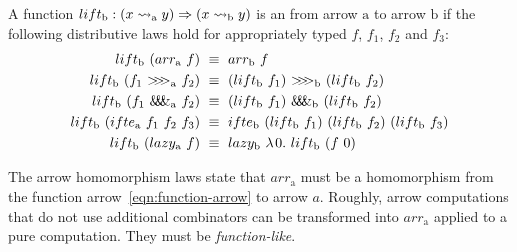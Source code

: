 \documentclass[preprint]{sigplanconf}
\newcommand{\arrow}{\rightsquigarrow}
\newcommand{\arrowlift}{\ensuremath{lift}}
\newcommand{\arrowarr}{\ensuremath{arr}}
\newcommand{\arrowcomp}{\ensuremath{{>}\mspace{-6mu}{>}\mspace{-6mu}{>}}}
\newcommand{\arrowpair}{\ensuremath{\mathit{\&\mspace{-7.5mu}\&\mspace{-7.5mu}\&}}}
\newcommand{\arrowif}{\ensuremath{ifte}}
\newcommand{\arrowlazy}{\ensuremath{lazy}}
\newcommand{\gen}{_\mathrm{a}}
\newcommand{\genb}{_\mathrm{b}}
\begin{document}
\begin{definition}
A function $lift\genb : (x \arrow\gen y) \tto (x \arrow\genb y)$ is an  from arrow $\mathrm{a}$ to arrow $\mathrm{b}$ if the following distributive laws hold for appropriately typed $f$, $f_1$, $f_2$ and $f_3$:
\begin{align}
	lift\genb~(\arrowarr\gen~f) &\ \equiv \ \arrowarr\genb~f
	\label{eqn:lift-distributes-over-arr}
\\
	lift\genb~(f_1~\arrowcomp\gen~f_2) &\ \equiv \ (lift\genb~f_1)~\arrowcomp\genb~(lift\genb~f_2)
	\label{eqn:lift-distributes-over-comp}
\\
	lift\genb~(f_1~\arrowpair\gen~f_2) &\ \equiv \ (lift\genb~f_1)~\arrowpair\genb~(lift\genb~f_2)
	\label{eqn:lift-distributes-over-pair}
\\
	\arrowlift\genb~(\arrowif\gen~f_1~f_2~f_3) &\ \equiv \ 
		\arrowif\genb~(lift\genb~f_1)~(lift\genb~f_2)~(lift\genb~f_3)
	\label{eqn:lift-distributes-over-if}
\\
	\arrowlift\genb~(\arrowlazy\gen~f) &\ \equiv \
		\arrowlazy\genb~\fun{0}{\arrowlift\genb~(f~0)}
	\label{eqn:lift-distributes-over-lazy}
\end{align}
\label{def:arrow-homomorphism}
\end{definition}

The arrow homomorphism laws state that $\arrowarr\gen$ must be a homomorphism from the function arrow~\eqref{eqn:function-arrow} to arrow $a$.
Roughly, arrow computations that do not use additional combinators can be transformed into $\arrowarr\gen$ applied to a pure computation.
They must be \emph{function-like}.
\end{document}
